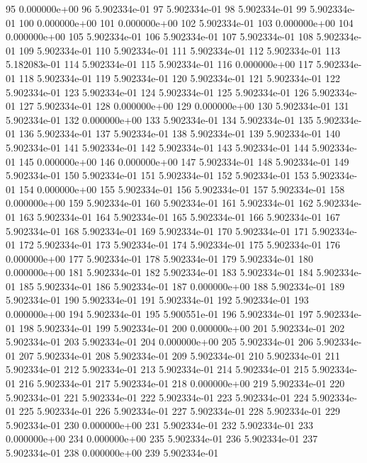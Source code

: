 \documentclass{article}
\begin{document}
\begin{Schunk}
\begin{Soutput}
95   0.000000e+00
96   5.902334e-01
97   5.902334e-01
98   5.902334e-01
99   5.902334e-01
100  0.000000e+00
101  0.000000e+00
102  5.902334e-01
103  0.000000e+00
104  0.000000e+00
105  5.902334e-01
106  5.902334e-01
107  5.902334e-01
108  5.902334e-01
109  5.902334e-01
110  5.902334e-01
111  5.902334e-01
112  5.902334e-01
113  5.182083e-01
114  5.902334e-01
115  5.902334e-01
116  0.000000e+00
117  5.902334e-01
118  5.902334e-01
119  5.902334e-01
120  5.902334e-01
121  5.902334e-01
122  5.902334e-01
123  5.902334e-01
124  5.902334e-01
125  5.902334e-01
126  5.902334e-01
127  5.902334e-01
128  0.000000e+00
129  0.000000e+00
130  5.902334e-01
131  5.902334e-01
132  0.000000e+00
133  5.902334e-01
134  5.902334e-01
135  5.902334e-01
136  5.902334e-01
137  5.902334e-01
138  5.902334e-01
139  5.902334e-01
140  5.902334e-01
141  5.902334e-01
142  5.902334e-01
143  5.902334e-01
144  5.902334e-01
145  0.000000e+00
146  0.000000e+00
147  5.902334e-01
148  5.902334e-01
149  5.902334e-01
150  5.902334e-01
151  5.902334e-01
152  5.902334e-01
153  5.902334e-01
154  0.000000e+00
155  5.902334e-01
156  5.902334e-01
157  5.902334e-01
158  0.000000e+00
159  5.902334e-01
160  5.902334e-01
161  5.902334e-01
162  5.902334e-01
163  5.902334e-01
164  5.902334e-01
165  5.902334e-01
166  5.902334e-01
167  5.902334e-01
168  5.902334e-01
169  5.902334e-01
170  5.902334e-01
171  5.902334e-01
172  5.902334e-01
173  5.902334e-01
174  5.902334e-01
175  5.902334e-01
176  0.000000e+00
177  5.902334e-01
178  5.902334e-01
179  5.902334e-01
180  0.000000e+00
181  5.902334e-01
182  5.902334e-01
183  5.902334e-01
184  5.902334e-01
185  5.902334e-01
186  5.902334e-01
187  0.000000e+00
188  5.902334e-01
189  5.902334e-01
190  5.902334e-01
191  5.902334e-01
192  5.902334e-01
193  0.000000e+00
194  5.902334e-01
195  5.900551e-01
196  5.902334e-01
197  5.902334e-01
198  5.902334e-01
199  5.902334e-01
200  0.000000e+00
201  5.902334e-01
202  5.902334e-01
203  5.902334e-01
204  0.000000e+00
205  5.902334e-01
206  5.902334e-01
207  5.902334e-01
208  5.902334e-01
209  5.902334e-01
210  5.902334e-01
211  5.902334e-01
212  5.902334e-01
213  5.902334e-01
214  5.902334e-01
215  5.902334e-01
216  5.902334e-01
217  5.902334e-01
218  0.000000e+00
219  5.902334e-01
220  5.902334e-01
221  5.902334e-01
222  5.902334e-01
223  5.902334e-01
224  5.902334e-01
225  5.902334e-01
226  5.902334e-01
227  5.902334e-01
228  5.902334e-01
229  5.902334e-01
230  0.000000e+00
231  5.902334e-01
232  5.902334e-01
233  0.000000e+00
234  0.000000e+00
235  5.902334e-01
236  5.902334e-01
237  5.902334e-01
238  0.000000e+00
239  5.902334e-01

\end{Soutput}
\end{Schunk}
\end{document}
